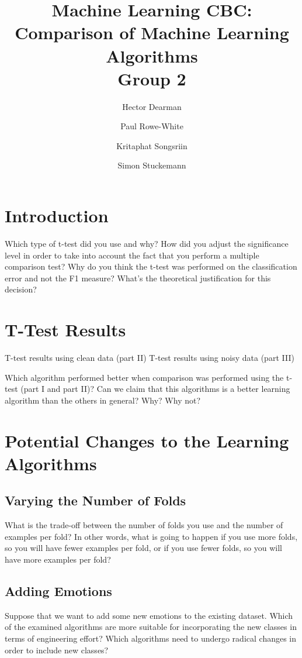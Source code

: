 \documentclass[10pt,a4paper]{article}
\author{Hector Dearman \and Paul Rowe-White \and Kritaphat Songsriin \and Simon Stuckemann}
\title{Machine Learning CBC: Comparison of Machine Learning Algorithms\\Group 2}
\begin{document}
\maketitle

\section{Introduction}
Which type of t-test did you use and why?
How did you adjust the significance level in order to take into account the fact that you perform a multiple comparison test?
Why do you think the t-test was performed on the classification error and not the F1 measure? What's the theoretical justification for this decision?

\section{T-Test Results}
T-test results using clean data (part II)
T-test results using noisy data (part III)

Which algorithm performed better when comparison was performed using the t-test (part I and part II)? Can we claim that this algorithms is a better learning algorithm than the others in general? Why? Why not?

\section{Potential Changes to the Learning Algorithms}
\subsection{Varying the Number of Folds}
What is the trade-off between the number of folds you use and the number of examples per fold? In other words, what is going to happen if you use more folds, so you will have fewer examples per fold, or if you use fewer folds, so you will have more examples per fold?

\subsection{Adding Emotions}
Suppose that we want to add some new emotions to the existing dataset. Which of the examined algorithms are more suitable for incorporating the new classes in terms of engineering effort? Which algorithms need to undergo radical changes in order to include new classes?
\end{document}
